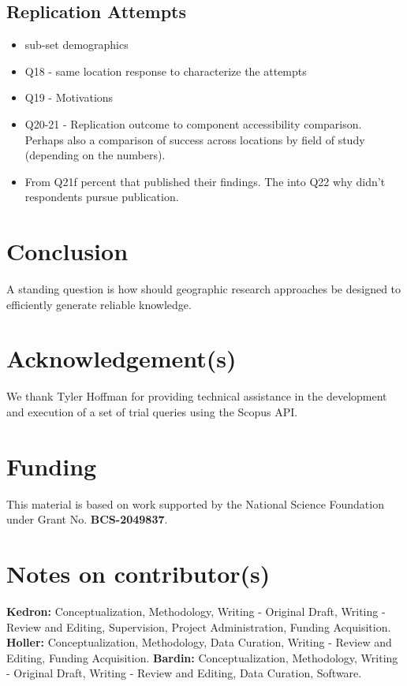 \documentclass[]{interact}
\theoremstyle{plain}%
\theoremstyle{definition}
\theoremstyle{remark}
\begin{document}
\subsection*{Replication Attempts}
\begin{itemize}
    \item sub-set demographics
    \item Q18 - same location response to characterize the attempts
    \item Q19 - Motivations
    \item Q20-21 - Replication outcome to component accessibility comparison. Perhaps also a comparison of success across locations by field of study (depending on the numbers).
    \item From Q21f percent that published their findings. The into Q22 why didn't respondents pursue publication.
\end{itemize}

\section*{Conclusion}
A standing question is how should geographic research approaches be designed to efficiently generate reliable knowledge.

\theendnotes


\section*{Acknowledgement(s)}
We thank Tyler Hoffman for providing technical assistance in the development and execution of a set of trial queries using the Scopus API.

\section*{Funding}
This material is based on work supported by the National Science Foundation under Grant No. \textbf{BCS-2049837}.

\section*{Notes on contributor(s)}
\textbf{Kedron:} Conceptualization, Methodology, Writing - Original Draft, Writing - Review and Editing, Supervision, Project Administration, Funding Acquisition. \textbf{Holler:} Conceptualization, Methodology, Data Curation, Writing - Review and Editing, Funding Acquisition. \textbf{Bardin:} Conceptualization, Methodology, Writing - Original Draft, Writing - Review and Editing, Data Curation, Software.
\end{document}
